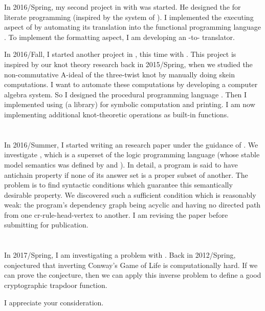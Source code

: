 \documentclass[letterpaper, 12pt]{extarticle}
\begin{document}
\myskip

In 2016/Spring, my second project in \pl{} with \nr{} was started.
He designed the \ledlong{} for literate programming
(inspired by the  system of \dknuth).
I implemented the executing aspect of \led{}
by automating its translation into the functional programming language \sllang.
To implement the formatting aspect,
I am developing an \led-to-\tex{} translator.

\newpage

In 2016/Fall, I started another project in \pl,
this time with \rglong.
This project is inspired by our
knot theory research back in 2015/Spring,
when we studied
the non-commutative A-ideal of the three-twist knot
by manually doing skein computations.
I want to automate these computations
by developing a computer algebra system.
So I designed the procedural programming language \kn.
Then I implemented \kn{}
using  (a \python{} library)
for symbolic computation and \tex{} printing.
I am now implementing additional knot-theoretic operations
as \kn{} built-in functions.

\section{\ai}

In 2016/Summer, I started writing an \ai{} research paper
under the guidance of \mglong.
We investigate \cplong{},
which is a superset of the logic programming language \aplong{}
(whose stable model semantics was defined by \mg{} and \vl).
In detail, a \cp{} program is said to have
antichain property if
none of its answer set is a proper subset of another.
The problem is to find syntactic conditions
which guarantee this semantically desirable property.
We discovered such a sufficient condition which is
reasonably weak:
the program's dependency graph
being acyclic and
having no directed path from one cr-rule-head-vertex to
another.
I am revising the paper before submitting for publication.

\section{\ct}

In 2017/Spring, I am investigating a \ct{} problem with
\cmlong.
Back in 2012/Spring, \cm{} conjectured that
inverting Conway's Game of Life is computationally hard.
If we can prove the conjecture,
then we can apply this inverse problem
to define a good cryptographic trapdoor function.

\myrule

I appreciate your consideration.

\end{document}
